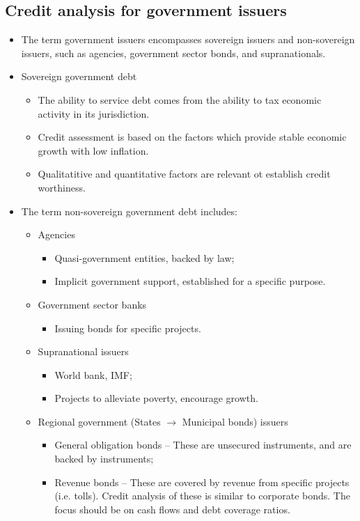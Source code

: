 \documentclass[../notes_compiled.tex]{subfiles}
\begin{document}
\subsection{Credit analysis for government issuers}
\begin{itemize}
\item The term government issuers encompasses sovereign issuers and non-sovereign issuers, such as agencies, government sector bonds, and supranationals.
\item Sovereign government debt
\begin{itemize}
\item The ability to service debt comes from the ability to tax economic activity in its jurisdiction.
\item Credit assessment is based on the factors which provide stable economic growth with low inflation.
\item Qualitatitive and quantitative factors are relevant ot establish credit worthiness.
\end{itemize}

\item The term non-sovereign government debt includes:
\begin{itemize}
\item Agencies
\begin{itemize}
\item Quasi-government entities, backed by law;
\item Implicit government support, established for a specific purpose.
\end{itemize}
\item Government sector banks
\begin{itemize}
\item Issuing bonds for specific projects.
\end{itemize}
\item Supranational issuers
\begin{itemize}
\item World bank, IMF;
\item Projects to alleviate poverty, encourage growth.
\end{itemize}
\item Regional government (States $\rightarrow$ Municipal bonds) issuers
\begin{itemize}
\item General obligation bonds -- These are unsecured instruments, and are backed by instruments;
\item Revenue bonds -- These are covered by revenue from specific projects (i.e. tolls). Credit analysis of these is similar to corporate bonds. The focus should be on cash flows and debt coverage ratios.
\end{itemize}
\end{itemize}


\end{itemize}
\end{document}
